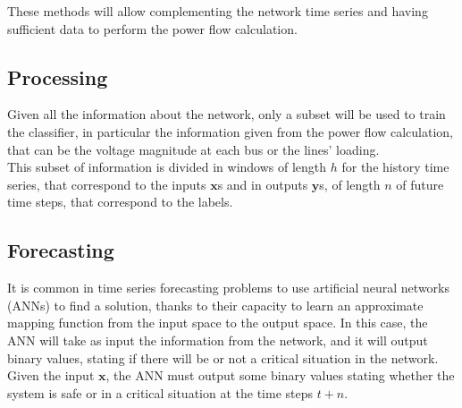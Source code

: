 These methods will allow complementing the network time series and having sufficient data to perform the power flow calculation.

\subsection{Processing}
Given all the information about the network, only a subset will be used to train the classifier, in particular the information given from the power flow calculation, that can be the voltage magnitude at each bus or the lines' loading. \\

This subset of information is divided in windows of length $h$ for the history time series, that correspond to the inputs $\textbf{x}$s and in outputs $\textbf{y}$s, of length $n$ of future time steps, that correspond to the labels.



\subsection{Forecasting}
It is common in time series forecasting problems to use artificial neural networks (\glspl{ANN}) to find a solution, thanks to their capacity to learn an approximate mapping function from the input space to the output space. In this case, the \gls{ANN} will take as input the information from the network, and it will output binary values, stating if there will be or not a critical situation in the network. \\

\noindent Given the input $\textbf{x}$, the \gls{ANN} must output some binary values stating whether the system is safe or in a critical situation at the time steps $t+n$. \\


